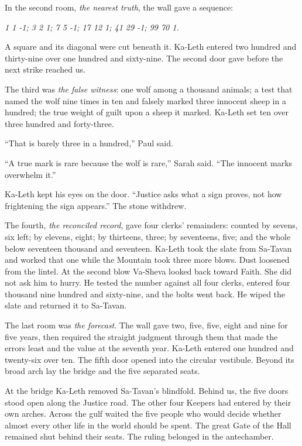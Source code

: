 In the second room, \emph{the nearest truth}, the wall gave a sequence:

\begin{center}
\textit{1 1 -1; 3 2 1; 7 5 -1; 17 12 1; 41 29 -1; 99 70 1.}
\end{center}

A square and its diagonal were cut beneath it. Ka-Leth entered two hundred and thirty-nine over one hundred and sixty-nine. The second door gave before the next strike reached us.

The third was \emph{the false witness}: one wolf among a thousand animals; a test that named the wolf nine times in ten and falsely marked three innocent sheep in a hundred; the true weight of guilt upon a sheep it marked. Ka-Leth set ten over three hundred and forty-three.

``That is barely three in a hundred,'' Paul said.

``A true mark is rare because the wolf is rare,'' Sarah said. ``The innocent marks overwhelm it.''

Ka-Leth kept his eyes on the door. ``Justice asks what a sign proves, not how frightening the sign appears.'' The stone withdrew.

The fourth, \emph{the reconciled record}, gave four clerks' remainders: counted by sevens, six left; by elevens, eight; by thirteens, three; by seventeens, five; and the whole below seventeen thousand and seventeen. Ka-Leth took the slate from Sa-Tavan and worked that one while the Mountain took three more blows. Dust loosened from the lintel. At the second blow Va-Sheva looked back toward Faith. She did not ask him to hurry. He tested the number against all four clerks, entered four thousand nine hundred and sixty-nine, and the bolts went back. He wiped the slate and returned it to Sa-Tavan.

The last room was \emph{the forecast}. The wall gave two, five, five, eight and nine for five years, then required the straight judgment through them that made the errors least and the value at the seventh year. Ka-Leth entered one hundred and twenty-six over ten. The fifth door opened into the circular vestibule. Beyond its broad arch lay the bridge and the five separated seats.

At the bridge Ka-Leth removed Sa-Tavan's blindfold. Behind us, the five doors stood open along the Justice road. The other four Keepers had entered by their own arches. Across the gulf waited the five people who would decide whether almost every other life in the world should be spent. The great Gate of the Hall remained shut behind their seats. The ruling belonged in the antechamber.

